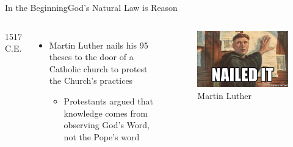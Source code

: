 \begin{frame}{In the Beginning}{God's Natural Law is Reason}
	\begin{columns}[T]
			1517 C.E.
			\begin{itemize}
				\item Martin Luther nails his 95 theses to the door of a Catholic church to protest the Church's practices
					\begin{itemize}
						\item Protestants argued that knowledge comes from observing God's Word, not the Pope's word
					\end{itemize}
			\end{itemize}
			\begin{figure}
				\centering
				\includegraphics[width=\textwidth]{images/martin_luther}
				\caption{Martin Luther}
			\end{figure}
	\end{columns}
\end{frame}

